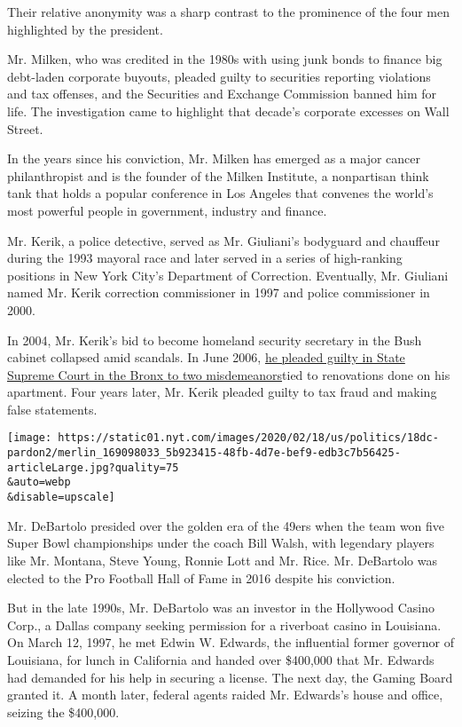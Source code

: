 Their relative anonymity was a sharp contrast to the prominence of the
four men highlighted by the president.

Mr. Milken, who was credited in the 1980s with using junk bonds to
finance big debt-laden corporate buyouts, pleaded guilty to securities
reporting violations and tax offenses, and the Securities and Exchange
Commission banned him for life. The investigation came to highlight that
decade's corporate excesses on Wall Street.

In the years since his conviction, Mr. Milken has emerged as a major
cancer philanthropist and is the founder of the Milken Institute, a
nonpartisan think tank that holds a popular conference in Los Angeles
that convenes the world's most powerful people in government, industry
and finance.

Mr. Kerik, a police detective, served as Mr. Giuliani's bodyguard and
chauffeur during the 1993 mayoral race and later served in a series of
high-ranking positions in New York City's Department of Correction.
Eventually, Mr. Giuliani named Mr. Kerik correction commissioner in 1997
and police commissioner in 2000.

In 2004, Mr. Kerik's bid to become homeland security secretary in the
Bush cabinet collapsed amid scandals. In June 2006,
\href{https://www.nytimes.com/2006/07/01/nyregion/01kerik.html}{he
pleaded guilty in State Supreme Court in the Bronx to two
misdemeanors}tied to renovations done on his apartment. Four years
later, Mr. Kerik pleaded guilty to tax fraud and making false
statements.

\texttt{[image: https://static01.nyt.com/images/2020/02/18/us/politics/18dc-pardon2/merlin\_169098033\_5b923415-48fb-4d7e-bef9-edb3c7b56425-articleLarge.jpg?quality=75\\\&auto=webp\\\&disable=upscale]}

Mr. DeBartolo presided over the golden era of the 49ers when the team
won five Super Bowl championships under the coach Bill Walsh, with
legendary players like Mr. Montana, Steve Young, Ronnie Lott and Mr.
Rice. Mr. DeBartolo was elected to the Pro Football Hall of Fame in 2016
despite his conviction.

But in the late 1990s, Mr. DeBartolo was an investor in the Hollywood
Casino Corp., a Dallas company seeking permission for a riverboat casino
in Louisiana. On March 12, 1997, he met Edwin W. Edwards, the
influential former governor of Louisiana, for lunch in California and
handed over \$400,000 that Mr. Edwards had demanded for his help in
securing a license. The next day, the Gaming Board granted it. A month
later, federal agents raided Mr. Edwards's house and office, seizing the
\$400,000.

